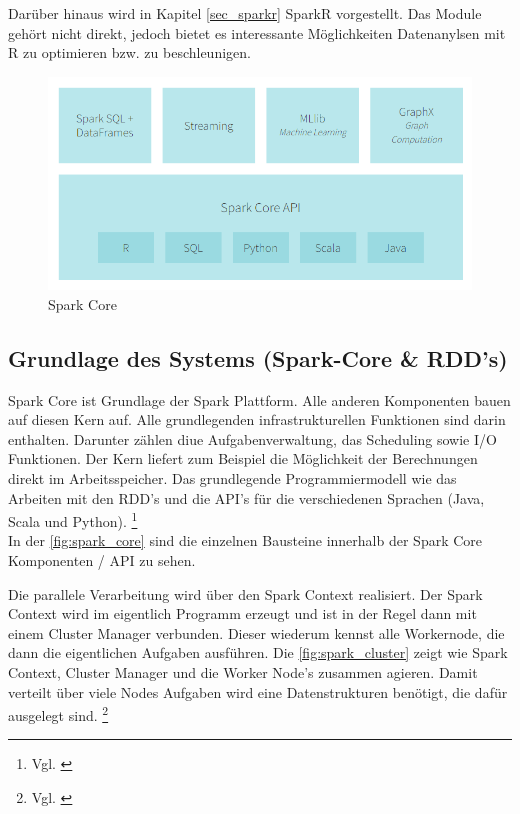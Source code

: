 \noindent
Dar\"uber hinaus wird in Kapitel \ref{sec_sparkr} SparkR vorgestellt. Das Module gehört nicht direkt, jedoch bietet es interessante Möglichkeiten Datenanylsen mit R zu optimieren bzw. zu beschleunigen.


\begin{figure}[h]
  \centering
  \includegraphics[width=\textwidth]{./bilder/spark_core.png}
  \caption{Spark Core}\label{fig:spark_core}
\end{figure}









\newpage
\subsection{Grundlage des Systems (Spark-Core \& RDD’s)}\label{sec_sparkcore}
Spark Core ist Grundlage der Spark Plattform. Alle anderen Komponenten bauen auf diesen Kern auf. Alle grundlegenden infrastrukturellen Funktionen sind darin enthalten. Darunter zählen diue Aufgabenverwaltung, das Scheduling sowie I/O Funktionen.
Der Kern liefert zum Beispiel die Möglichkeit der Berechnungen direkt im Arbeitsspeicher. 
Das grundlegende Programmiermodell wie das Arbeiten mit den RDD's und die API's für die verschiedenen Sprachen (Java, Scala und Python).  \footnote{Vgl. \cite{DATABRICK_ABOUT}} \\
In der \autoref{fig:spark_core} sind die einzelnen Bausteine innerhalb der Spark Core Komponenten / API zu sehen. 
 

\noindent
Die parallele Verarbeitung wird über den Spark Context realisiert. Der Spark Context wird im eigentlich Programm erzeugt und ist in der Regel dann mit einem Cluster Manager verbunden. Dieser wiederum kennst alle Workernode, die dann die eigentlichen Aufgaben ausführen. Die \autoref{fig:spark_cluster} zeigt wie Spark Context, Cluster Manager und die Worker Node's zusammen agieren. Damit verteilt über viele Nodes Aufgaben wird eine Datenstrukturen benötigt, die dafür ausgelegt sind. \footnote{Vgl. \cite[101]{BDS16}}

